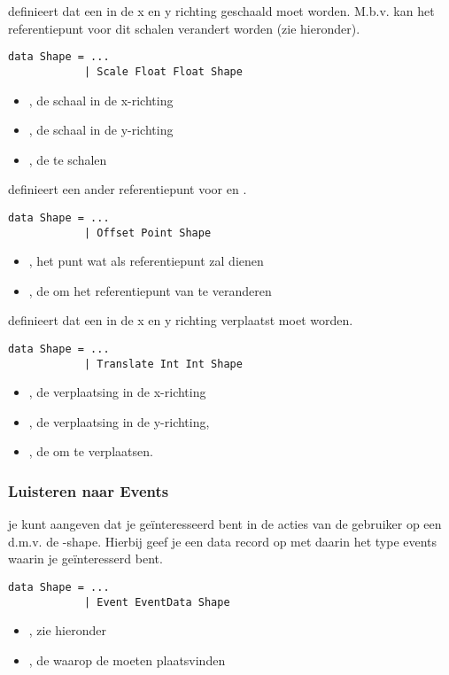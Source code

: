  definieert dat een \shape in de x en y richting geschaald moet worden. M.b.v.  kan het referentiepunt voor dit schalen verandert worden (zie hieronder).
\begin{lstlisting}
data Shape = ...
			| Scale Float Float Shape
\end{lstlisting}
\begin{itemize}
	\item {}, de schaal in de x-richting
	\item {}, de schaal in de y-richting
	\item {}, de te schalen \shape
\end{itemize}

 definieert een ander referentiepunt voor  en .
\begin{lstlisting}
data Shape = ...
			| Offset Point Shape
\end{lstlisting}
\begin{itemize}
	\item {}, het punt wat als referentiepunt zal dienen
	\item {}, de \shape om het referentiepunt van te veranderen
\end{itemize}

 definieert dat een \shape in de x en y richting verplaatst moet worden.
\begin{lstlisting}
data Shape = ...
			| Translate Int Int Shape
\end{lstlisting}
\begin{itemize}
	\item {}, de verplaatsing in de x-richting
	\item {}, de verplaatsing in de y-richting,
	\item {}, de \shape om te verplaatsen. 
\end{itemize}

\subsubsection{Luisteren naar Events}
je kunt aangeven dat je geïnteresseerd bent in de acties van de gebruiker op een \shape d.m.v. de -shape. Hierbij geef je een data record op met daarin het type events waarin je geïnteresserd bent.

\begin{lstlisting}
data Shape = ...
			| Event EventData Shape
\end{lstlisting}
\begin{itemize}
	\item {}, zie hieronder
	\item {}, de \shape waarop de \events moeten plaatsvinden
\end{itemize}

